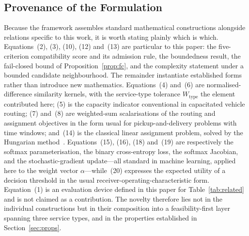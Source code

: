 \documentclass[conference]{IEEEtran}
\begin{document}
\subsection{Provenance of the Formulation}
Because the framework assembles standard mathematical constructions alongside
relations specific to this work, it is worth stating plainly which is which.
Equations~(2), (3), (10), (12) and~(13) are particular to this paper: the
five-criterion compatibility score and its admission rule, the boundedness
result, the fail-closed bound of Proposition~\ref{prop:fc}, and the complexity
statement under a bounded candidate neighbourhood. The remainder instantiate
established forms rather than introduce new mathematics. Equations~(4)
and~(6) are normalised-difference similarity kernels, with the service-type
tolerance $W_{\text{type}}$ the element contributed here; (5) is the capacity
indicator conventional in capacitated vehicle routing; (7) and~(8) are
weighted-sum scalarisations of the routing and assignment objectives in the
form usual for pickup-and-delivery problems with time windows; and~(14) is the
classical linear assignment problem, solved by the Hungarian
method~\cite{kuhn1955}. Equations~(15), (16), (18) and~(19) are respectively
the softmax parameterisation, the binary cross-entropy loss, the softmax
Jacobian, and the stochastic-gradient update---all standard in machine
learning, applied here to the weight vector $\alpha$---while~(20) expresses
the expected utility of a decision threshold in the usual
receiver-operating-characteristic form. Equation~(1) is an evaluation device
defined in this paper for Table~\ref{tab:related} and is not claimed as a
contribution. The novelty therefore lies not in the individual constructions
but in their composition into a feasibility-first layer spanning three service
types, and in the properties established in Section~\ref{sec:props}.
\end{document}
